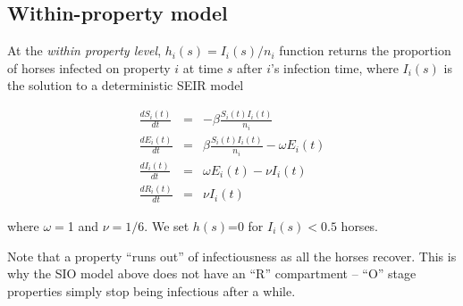 \documentclass[english]{article}
\begin{document}
\subsection{Within-property model}

At the \emph{within property level}, $h_{i}(s)=I_{i}(s)/n_{i}$ function
returns the proportion of horses infected on property $i$ at time
$s$ after $i$'s infection time, where $I_{i}(s)$ is the solution
to a deterministic SEIR model 

\begin{eqnarray*}
\frac{dS_{i}(t)}{dt} & = & -\beta\frac{S_{i}(t)I_{i}(t)}{n_{i}}\\
\frac{dE_{i}(t)}{dt} & = & \beta\frac{S_{i}(t)I_{i}(t)}{n_{i}}-\omega E_{i}(t)\\
\frac{dI_{i}(t)}{dt} & = & \omega E_{i}(t)-\nu I_{i}(t)\\
\frac{dR_{i}(t)}{dt} & = & \nu I_{i}(t)
\end{eqnarray*}


where $\omega=$1 and $\nu=1/6$. We set $h(s)$=0 for $I_{i}(s)<0.5$
horses. 

Note that a property ``runs out'' of infectiousness as all the horses
recover. This is why the SIO model above does not have an ``R''
compartment -- ``O'' stage properties simply stop being infectious
after a while.
\end{document}

